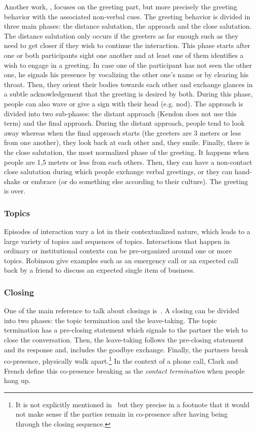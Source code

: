 \documentclass[a4paper,11pt,twoside]{StyleThese}
\begin{document}
Another work, \cite{kendon_1990_conducting}, focuses on the greeting part, but more precisely the greeting behavior with the associated non-verbal cues. The greeting behavior is divided in three main phases: the distance salutation, the approach and the close salutation. 
The distance salutation only occurs if the greeters as far enough such as they need to get closer if they wish to continue the interaction. This phase starts after one or both participants sight one another and at least one of them identifies a wish to engage in a greeting. In case one of the participant has not seen the other one, he signals his presence by vocalizing the other one’s name or by clearing his throat. Then, they orient their bodies towards each other and exchange glances in a subtle acknowledgement that the greeting is desired by both. During this phase, people can also wave or give a sign with their head (e.g. nod).
The approach is divided into two sub-phases: the distant approach (Kendon does not use this term) and the final approach. During the distant approach, people tend to look away whereas when the final approach starts (the greeters are 3 meters or less from one another), they look back at each other and, they smile.
Finally, there is the close salutation, the most normalized phase of the greeting. It happens when people are 1,5 meters or less from each others. Then, they can have a non-contact close salutation during which people exchange verbal greetings, or they can hand-shake or embrace (or do something else according to their culture). The greeting is over.
\subsubsection{Topics}
Episodes of interaction vary a lot in their contextualized nature, which leads to a large variety of topics and sequences of topics. Interactions that happen in ordinary or institutional contexts can be pre-organized around one or more topics. Robinson give examples such as an emergency call or an expected call back by a friend to discuss an expected single item of business.

\subsubsection{Closing}
One of the main reference to talk about closings is~\cite{schegloff_1973_opening}. A closing can be divided into two phases: the topic termination and the leave-taking.
The topic termination has a pre-closing statement which signals to the partner the wish to close the conversation. Then, the leave-taking follows the pre-closing statement and its response and, includes the goodbye exchange. Finally, the partners break co-presence, \ie physically walk apart.\footnote{It is not explicitly mentioned in~\cite{schegloff_1973_opening}  but they precise in a footnote that it would not make sense if the parties remain in co-presence after having being through the closing sequence.} In the context of a phone call, Clark and French define this co-presence breaking as the \textit{contact termination} when people hang up.
\end{document}
